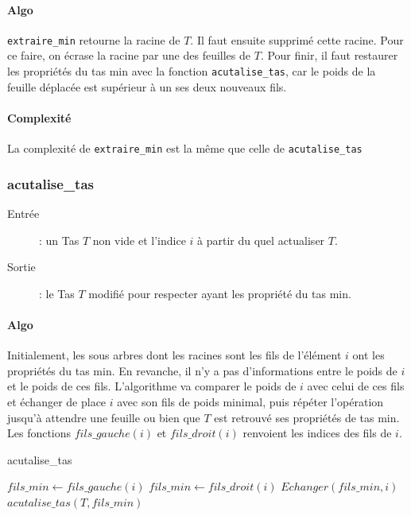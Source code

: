 \documentclass[a4paper,11pt]{article}
\begin{document}
\paragraph*{Algo}
\texttt{extraire\_min} retourne la racine de $T$. Il faut ensuite supprimé cette racine. Pour ce faire, on écrase la racine par une des feuilles de $T$. Pour finir, il faut restaurer les propriétés du tas min avec la fonction \texttt{acutalise\_tas}, car le poids de la feuille déplacée est supérieur à un ses deux nouveaux fils.
\paragraph*{Complexité}
La complexité de \texttt{extraire\_min} est la même que celle de \texttt{acutalise\_tas}
\subsubsection*{acutalise\_tas}
\begin{description}
\item[Entrée] : un \textsf{Tas} $T$ non vide et l'indice $i$ à partir du quel actualiser $T$.
\item[Sortie] : le \textsf{Tas} $T$ modifié pour respecter ayant les propriété du tas min.
\end{description}
\paragraph*{Algo}
Initialement, les sous arbres dont les racines sont les fils de l'élément $i$ ont les propriétés du tas min. En revanche, il n'y a pas d'informations entre le poids de $i$ et le poids de ces fils. L'algorithme va comparer le poids de $i$ avec celui de ces fils et échanger de place $i$ avec son fils de poids minimal, puis répéter l'opération jusqu’à attendre une feuille ou bien que $T$ est retrouvé ses propriétés de tas min.\\
Les fonctions $fils\_gauche(i)$ et $fils\_droit(i)$ renvoient les indices des fils de $i$.
\begin{algorithm}
\caption{acutalise\_tas}
\begin{algorithmic}[1]
\STATE $fils\_min \leftarrow fils\_gauche(i)$
\ELSE
\STATE $fils\_min \leftarrow fils\_droit(i)$
\ENDIF
{}
\STATE $Echanger(fils\_min, i)$
\STATE $acutalise\_tas(T, fils\_min)$
\ENDIF
\ENDIF
\end{algorithmic}
\end{algorithm}
\end{document}
